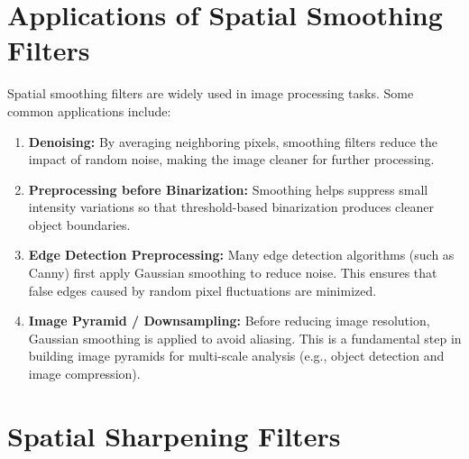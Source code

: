 \documentclass[12 pt]{article}        	%
\begin{document}
\section{Applications of Spatial Smoothing Filters}
Spatial smoothing filters are widely used in image processing tasks. 
Some common applications include:
\begin{enumerate}
    \item \textbf{Denoising:} 
    By averaging neighboring pixels, smoothing filters reduce the impact 
    of random noise, making the image cleaner for further processing.

    \item \textbf{Preprocessing before Binarization:} 
    Smoothing helps suppress small intensity variations so that threshold-based 
    binarization produces cleaner object boundaries.

    \item \textbf{Edge Detection Preprocessing:} 
    Many edge detection algorithms (such as Canny) first apply Gaussian smoothing 
    to reduce noise. This ensures that false edges caused by random pixel fluctuations 
    are minimized.

    \item \textbf{Image Pyramid / Downsampling:} 
    Before reducing image resolution, Gaussian smoothing is applied to avoid aliasing. 
    This is a fundamental step in building image pyramids for multi-scale analysis 
    (e.g., object detection and image compression).
\end{enumerate}

\section{Spatial Sharpening Filters}
\end{document}
